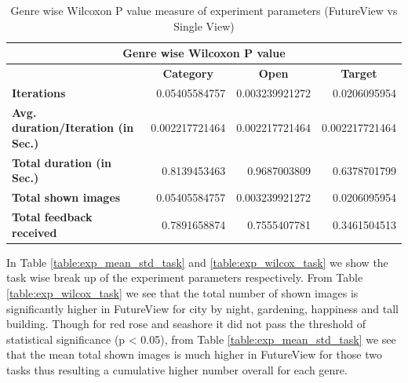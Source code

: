 \documentclass[english]{tktltiki}
\begin{document}
\begin{table}
	\small
	\begin{center}
    \begin{tabular}{|l|r|r|r|}
        \hline
        \multicolumn{4}{|c|}{\textbf{Genre wise Wilcoxon P value}} \\
        \hline
        
        \multicolumn{1}{|c|}{} & \multicolumn{1}{|c|}{\textbf{Category}} & \multicolumn{1}{|c|}{\textbf{Open}} & \multicolumn{1}{|c|}{\textbf{Target}} \\
        \hline
        
        
        
        \multicolumn{1}{|l|}{\textbf{Iterations}} & 0.05405584757 & 0.003239921272 & 0.0206095954 \\
        \hline
        
        \multicolumn{1}{|l|}{\textbf{Avg. duration/Iteration (in Sec.)}} & 0.002217721464 & 0.002217721464 & 0.002217721464 \\
        \hline
        
        \multicolumn{1}{|l|}{\textbf{Total duration (in Sec.)}} & 0.8139453463 & 0.9687003809 & 0.6378701799 \\
        \hline
        
        \multicolumn{1}{|l|}{\textbf{Total shown images}} & 0.05405584757 & 0.003239921272 & 0.0206095954 \\
        \hline
        
        \multicolumn{1}{|l|}{\textbf{Total feedback received}} & 0.7891658874 & 0.7555407781 & 0.3461504513 \\
        \hline
        
    \end{tabular}
	\end{center}
	\caption{Genre wise Wilcoxon P value measure of experiment parameters (FutureView vs Single View)}
    \label{table:exp_wilcoxon_genre}
\end{table}

 In Table \ref{table:exp_mean_std_task} and \ref{table:exp_wilcox_task} we show the task wise break up of the experiment parameters respectively. From Table \ref{table:exp_wilcox_task} we see that the total number of shown images is significantly higher in FutureView for city by night, gardening, happiness and tall building. Though for red rose and seashore it did not pass the threshold of statistical significance (p < 0.05), from Table \ref{table:exp_mean_std_task} we see that the mean total shown images is much higher in FutureView for those two tasks thus resulting a cumulative higher number overall for each genre.
\end{document}
